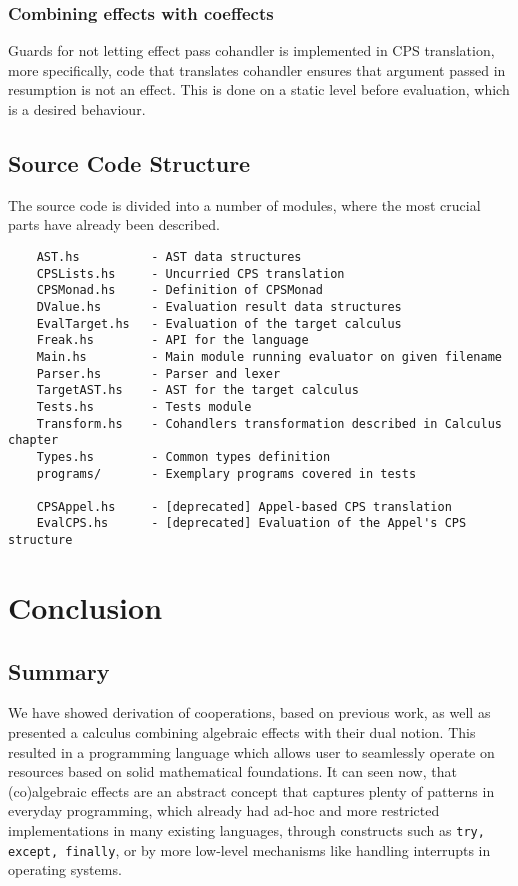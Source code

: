 \documentclass[declaration,shortabstract]{iithesis}
\theoremstyle{definition} \newtheorem{definition}{Definition}[chapter]
\theoremstyle{remark} \newtheorem{remark}[definition]{Observation}
\theoremstyle{plain} \newtheorem{theorem}[definition]{Theorem}
\theoremstyle{plain} \newtheorem{lemma}[definition]{Lemma}
\begin{document}
    \subsection{Combining effects with coeffects}

    Guards for not letting effect pass cohandler is implemented in CPS
    translation, more specifically, code that translates cohandler ensures that
    argument passed in resumption is not an effect. This is done on a static
    level before evaluation, which is a desired behaviour.

    \section{Source Code Structure}

    The source code is divided into a number of modules, where the most
    crucial parts have already been described.

\begin{verbatim}
    AST.hs          - AST data structures
    CPSLists.hs     - Uncurried CPS translation
    CPSMonad.hs     - Definition of CPSMonad
    DValue.hs       - Evaluation result data structures
    EvalTarget.hs   - Evaluation of the target calculus
    Freak.hs        - API for the language
    Main.hs         - Main module running evaluator on given filename
    Parser.hs       - Parser and lexer
    TargetAST.hs    - AST for the target calculus
    Tests.hs        - Tests module
    Transform.hs    - Cohandlers transformation described in Calculus chapter
    Types.hs        - Common types definition
    programs/       - Exemplary programs covered in tests

    CPSAppel.hs     - [deprecated] Appel-based CPS translation
    EvalCPS.hs      - [deprecated] Evaluation of the Appel's CPS structure
\end{verbatim}

\chapter{Conclusion}\label{chapter:conclusion}
\section{Summary}

    We have showed derivation of cooperations, based on previous work, as well
    as presented a calculus combining algebraic effects with their dual notion.
    This resulted in a programming language which allows user to seamlessly
    operate on resources based on solid mathematical foundations. It can seen now,
    that (co)algebraic effects are an abstract concept that captures plenty of
    patterns in everyday programming, which already had ad-hoc and more
    restricted implementations in many existing languages, through constructs
    such as \verb!try, except, finally!, or by more low-level mechanisms
    like handling interrupts in operating systems.
\end{document}
